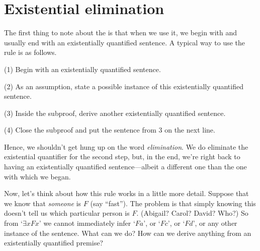 

\section{Existential elimination}

The first thing to note about the  is that when we use it, we begin with and usually end with an existentially quantified sentence. A typical way to use the rule is as follows. 

\begin{ebullet}
\item[(1)] Begin with an existentially quantified sentence. 
\item[(2)] As an assumption, state a possible instance of this existentially quantified sentence. 
\item[(3)] Inside the subproof, derive another existentially quantified sentence.
\item[(4)] Close the subproof and put the sentence from 3 on the next line. 
\end{ebullet}

\noindent Hence, we shouldn't get hung up on the word \textit{elimination}. We do eliminate the existential quantifier for the second step, but, in the end, we're right back to having an existentially quantified sentence---albeit a different one than the one with which we began.

Now, let's think about how this rule works in a little more detail. Suppose that we know that \emph{someone} is $F$ (say ``fast''). The problem is that simply knowing this doesn't tell us which particular person is $F$. (Abigail? Carol? David? Who?) So from `$\exists x Fx$' we cannot immediately infer `$Fa$', or `$Fc$', or `$Fd$',  or any other instance of the sentence. What can we do?  How can we derive anything from an existentially quantified premise?

